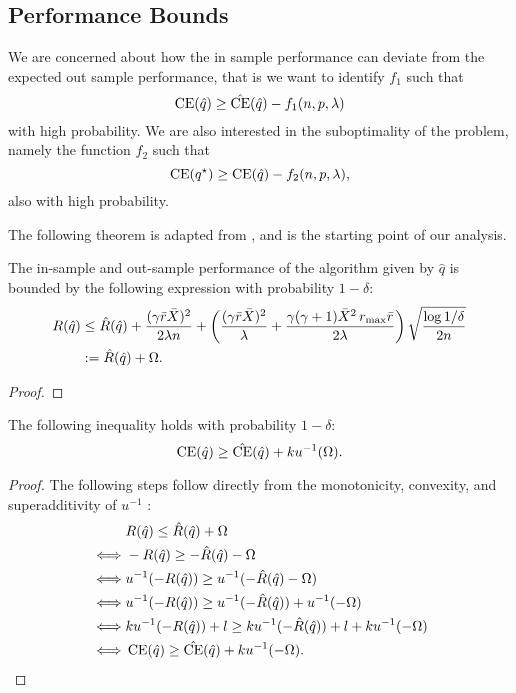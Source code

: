 \documentclass{article}
\begin{document}
\subsection{Performance Bounds}

We are concerned about how the in sample performance can deviate from the expected out sample
performance, that is we want to identify $f_1$ such that
\[
  \operatorname{CE}(\hat q) \geq \hat{\operatorname{CE}}(\hat q) - f_1(n,p,\lambda)
\]
with high probability. We are also interested in the suboptimality of the problem, namely
the function $f_2$ such that
\[
  \operatorname{CE}(q^\star) \geq \operatorname{CE}(\hat q) - f_2(n,p,\lambda),
\]
also with high probability. 

The following theorem is adapted from \cite{bousquet2002stability}, and is the starting point of our
analysis. 

\begin{thm}
  \label{thm1}
  The in-sample and out-sample performance of the algorithm given by $\hat q$ is bounded
  by the following expression with probability $1-\delta$:
  \begin{align*}
    R(\hat q) &\leq \hat R(\hat q) + \frac{(\gamma\bar r\bar X)^2}{2\lambda n} +
    \left(\frac{(\gamma\bar r\bar X)^2}{\lambda} + \frac{\gamma(\gamma+1)\bar X^2\,r_{\max}\bar
    r}{2\lambda}\right)\sqrt{\frac{\log 1/\delta}{2n}}\\
              &:= \hat R(\hat q) + \Omega.
  \end{align*}
\end{thm}

\begin{proof}
\end{proof}

\begin{thm}
  \label{thm2}
  The following inequality holds with probability $1-\delta$:
  \[
    \operatorname{CE}(\hat q) \geq \hat{\operatorname{CE}}(\hat q) + ku^{-1}(\Omega).
  \]
\end{thm}

\begin{proof}
  The following steps follow directly from the monotonicity, convexity, and
  superadditivity of $u^{-1}$ :
  \begin{align*}
    & R(\hat q) \leq \hat R(\hat q) + \Omega\\
    \iff & -R(\hat q) \geq -\hat R(\hat q) - \Omega\\
    \iff & u^{-1}(-R(\hat q)) \geq u^{-1}(-\hat R(\hat q) - \Omega)\\
    \iff & u^{-1}(-R(\hat q)) \geq u^{-1}(-\hat R(\hat q)) + u^{-1}(-\Omega)\\
    \iff & ku^{-1}(-R(\hat q))+l \geq ku^{-1}(-\hat R(\hat q))+l + ku^{-1}(-\Omega)\\
    \iff & \operatorname{CE}(\hat q) \geq \hat{\operatorname{CE}}(\hat q) + ku^{-1}(-\Omega).\qedhere
  \end{align*}
\end{proof}
\end{document}
